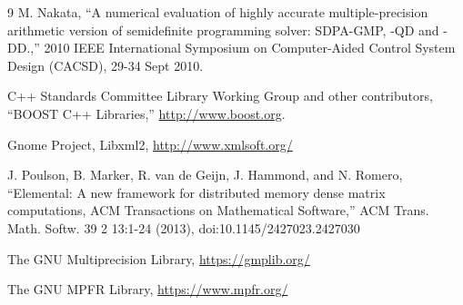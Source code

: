 \documentclass[12pt]{article}
\numberwithin{equation}{section}
\begin{document}
\begin{thebibliography}{9}
  M. Nakata,
  ``A numerical evaluation of highly accurate multiple-precision arithmetic version of semidefinite programming solver: SDPA-GMP, -QD and -DD.,''
  2010 IEEE International Symposium on Computer-Aided Control System Design (CACSD), 29-34 Sept 2010.

  C++ Standards Committee Library Working Group and other contributors,
  ``BOOST C++ Libraries,''
  \href{http://www.boost.org}{http://www.boost.org}.

  Gnome Project,
  Libxml2,
  \href{http://www.xmlsoft.org/}{http://www.xmlsoft.org/}

  J. Poulson, B. Marker, R. van de Geijn, J. Hammond, and N. Romero,
  ``Elemental: A new framework for distributed memory dense matrix computations, ACM Transactions on Mathematical Software,''
  ACM Trans. Math. Softw. 39 2 13:1-24 (2013),
  doi:10.1145/2427023.2427030
  
  The GNU Multiprecision Library,
  \href{https://gmplib.org/}{https://gmplib.org/}

  The GNU MPFR Library,
  \href{https://www.mpfr.org/}{https://www.mpfr.org/}

\end{thebibliography}
\end{document}
